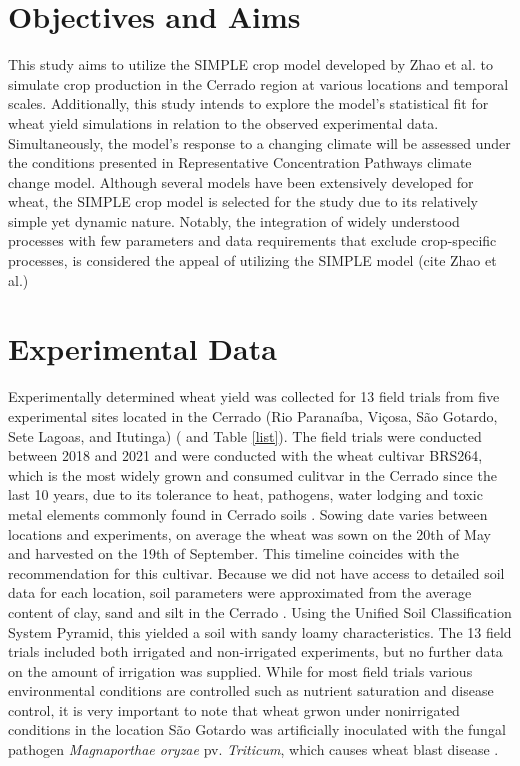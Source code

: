 \documentclass[11pt]{article}
\begin{document}
\section{Objectives and Aims}
\label{sec:org586cfce}
This study aims to utilize the SIMPLE crop model developed by Zhao et al. to simulate crop production in the Cerrado region at various locations and temporal scales. Additionally, this study intends to explore the model’s statistical fit for wheat yield simulations in relation to the observed experimental data. Simultaneously, the model’s response to a changing climate will be assessed under the conditions presented in Representative Concentration Pathways climate change model. Although several models have been extensively developed for wheat, the SIMPLE crop model is selected for the study due to its relatively simple yet dynamic nature. Notably, the integration of widely understood processes with few parameters and data requirements that exclude crop-specific processes, is considered the appeal of utilizing the SIMPLE model (cite Zhao et al.)

\section{Experimental Data}
\label{sec:orgcb8b96e}
Experimentally determined wheat yield was collected for 13 field trials from five experimental sites located in the Cerrado (Rio Paranaíba, Viçosa, São Gotardo, Sete Lagoas, and Itutinga) (\cite{casagrande-2023-new-brazil} and Table \ref{list}). The field trials were conducted between 2018 and 2021 and were conducted with the wheat cultivar BRS264, which is the most widely grown and consumed culitvar in the Cerrado since the last 10 years, due to its tolerance to heat, pathogens, water lodging and toxic metal elements commonly found in Cerrado soils \cite{albrecht-2021-cultiv-trigo}.
Sowing date varies between locations and experiments, on average the wheat was sown on the 20th of May and harvested on the 19th of September. This timeline coincides with the recommendation for this cultivar. Because we did not have access to detailed soil data for each location, soil parameters were approximated from the average content of clay, sand and silt in the Cerrado \cite{lopes-2016-chapt-one}. Using the Unified Soil Classification System Pyramid, this yielded a soil with sandy loamy characteristics. The 13 field trials included both irrigated and non-irrigated experiments, but no further data on the amount of irrigation was supplied. While for most field trials various environmental conditions are controlled such as nutrient saturation and disease control, it is very important to note that wheat grwon under nonirrigated conditions in the location São Gotardo was artificially inoculated with the fungal pathogen \emph{Magnaporthae oryzae} pv. \emph{Triticum}, which causes wheat blast disease \cite{albrecht-2021-cultiv-trigo}.
\end{document}
